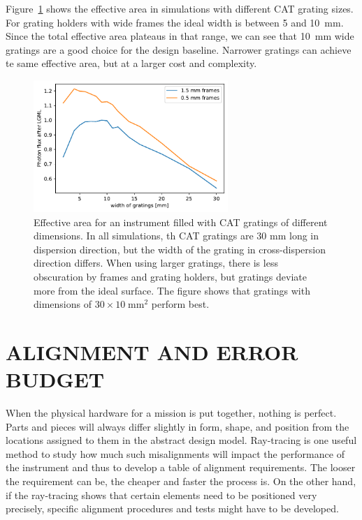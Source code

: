 \documentclass[]{spie}  %
\begin{document}
Figure~\ref{fig:width} shows the effective area in simulations with
different CAT grating sizes. For grating holders with wide frames the
ideal width is between 5 and 10~mm. Since the total effective area
plateaus in that range, we can see that 10~mm wide gratings are a good
choice for the design baseline. Narrower gratings can achieve te same
effective area, but at a larger cost and complexity.
\begin{figure} [ht]
  \begin{center}
    \includegraphics[height=5cm]{catdimensions.pdf}
  \end{center}
  \caption
      { \label{fig:width}Effective area for an instrument filled with
        CAT gratings of different dimensions. In all simulations, th
        CAT gratings are 30 mm long in dispersion direction, but the
        width of the grating in cross-dispersion direction
        differs. When using larger gratings, there is less obscuration
        by frames and grating holders, but gratings deviate more from
        the ideal surface. The figure shows that gratings with
        dimensions of $30\times10\;\mathrm{mm}^2$ perform best.  }
\end{figure}

\section{ALIGNMENT AND ERROR BUDGET}
\label{sect:align}
When the physical hardware for a mission is put together, nothing is
perfect. Parts and pieces will always differ slightly in form, shape,
and position from the locations assigned to them in the abstract
design model. Ray-tracing is one useful method to study how much such
misalignments will impact the performance of the instrument and thus
to develop a table of alignment requirements. The looser the
requirement can be, the cheaper and faster the process is. On the
other hand, if the ray-tracing shows that certain elements need to be
positioned very precisely, specific alignment procedures and tests
might have to be developed.
\end{document}
